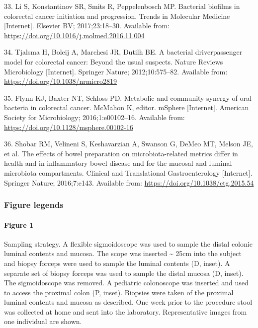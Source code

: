 \documentclass[12pt,]{article}
\let\oldparagraph\paragraph
\renewcommand{\paragraph}[1]{\oldparagraph{#1}\mbox{}}
\begin{document}
\hypertarget{ref-Li2017}{}
33. Li S, Konstantinov SR, Smits R, Peppelenbosch MP. Bacterial biofilms
in colorectal cancer initiation and progression. Trends in Molecular
Medicine {[}Internet{]}. Elsevier BV; 2017;23:18--30. Available from:
\url{https://doi.org/10.1016/j.molmed.2016.11.004}

\hypertarget{ref-Tjalsma2012}{}
34. Tjalsma H, Boleij A, Marchesi JR, Dutilh BE. A bacterial
driverpassenger model for colorectal cancer: Beyond the usual suspects.
Nature Reviews Microbiology {[}Internet{]}. Springer Nature;
2012;10:575--82. Available from:
\url{https://doi.org/10.1038/nrmicro2819}

\hypertarget{ref-Flynn2016}{}
35. Flynn KJ, Baxter NT, Schloss PD. Metabolic and community synergy of
oral bacteria in colorectal cancer. McMahon K, editor. mSphere
{[}Internet{]}. American Society for Microbiology; 2016;1:e00102--16.
Available from: \url{https://doi.org/10.1128/msphere.00102-16}

\hypertarget{ref-Shobar2016}{}
36. Shobar RM, Velineni S, Keshavarzian A, Swanson G, DeMeo MT, Melson
JE, et al. The effects of bowel preparation on microbiota-related
metrics differ in health and in inflammatory bowel disease and for the
mucosal and luminal microbiota compartments. Clinical and Translational
Gastroenterology {[}Internet{]}. Springer Nature; 2016;7:e143. Available
from: \url{https://doi.org/10.1038/ctg.2015.54}

\newpage

\subsubsection{Figure legends}\label{figure-legends}

\paragraph{Figure 1}\label{figure-1}

Sampling strategy. A flexible sigmoidoscope was used to sample the
distal colonic luminal contents and mucosa. The scope was inserted
\textasciitilde{} 25cm into the subject and biopsy forceps were used to
sample the luminal contents (D, inset). A separate set of biopsy forceps
was used to sample the distal mucosa (D, inset). The sigmoidoscope was
removed. A pediatric colonoscope was inserted and used to access the
proximal colon (P, inset). Biopsies were taken of the proximal luminal
contents and mucosa as described. One week prior to the procedure stool
was collected at home and sent into the laboratory. Representative
images from one individual are shown.
\end{document}
